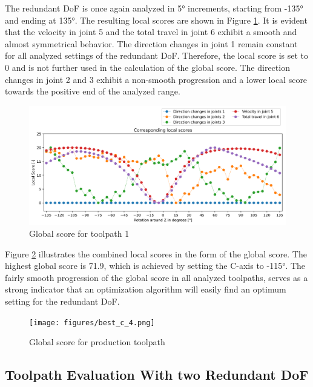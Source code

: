 The redundant \acrshort{DoF} is once again analyzed in 5° increments, starting from -135° and ending at 135°. The resulting local scores are shown in Figure \ref{LS4}. It is evident that the velocity in joint 5 and the total travel in joint 6 exhibit a smooth and almost symmetrical behavior. The direction changes in joint 1 remain constant for all analyzed settings of the redundant \acrshort{DoF}. Therefore, the local score is set to 0 and is not further used in the calculation of the global score. The direction changes in joint 2 and 3 exhibit a non-smooth progression and a lower local score towards the positive end of the analyzed range.

\begin{figure}[H]
	\centerline{\includegraphics[width=1\textwidth]{figures/LocalScores_4.png}}
	\caption{Global score for toolpath 1}
	\label{LS4}
\end{figure}

Figure \ref{GS4} illustrates the combined local scores in the form of the global score. The highest global score is 71.9, which is achieved by setting the C-axis to -115°. %
The fairly smooth progression of the global score in all analyzed toolpaths, serves as a strong indicator that an optimization algorithm will easily find an optimum setting for the redundant \acrshort{DoF}.

\begin{figure}[H]
	\centerline{\texttt{[image: figures/best\_c\_4.png]}}
	\caption{Global score for production toolpath}
	\label{GS4}
\end{figure}



\subsection{Toolpath Evaluation With two Redundant DoF}\label{2RDOF}

